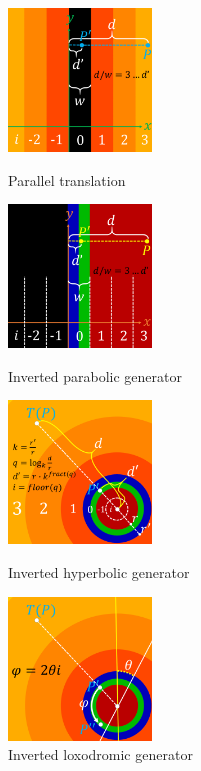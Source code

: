 \begin{figure}[h!tbp]
 \begin{minipage}[t]{0.24\hsize}
  \center
  \includegraphics[width=1.5in, height=1.5in, keepaspectratio]{../img/klein/2diis/translationMod.pdf}
  \caption{Parallel translation}
  \label{fig:translationMod}
 \end{minipage}
 \hspace*{\fill}
 \begin{minipage}[t]{0.24\hsize}
  \center
  \includegraphics[width=1.5in, height=1.5in, keepaspectratio]{../img/klein/2diis/parabolicMod.pdf}
  \caption{Inverted parabolic generator}
  \label{fig:parabolicMod}
 \end{minipage}
 \hspace*{\fill}
 \begin{minipage}[t]{0.24\hsize}
  \center
  \includegraphics[width=1.5in, height=1.5in, keepaspectratio]{../img/klein/2diis/hyperbolicMod.pdf}
  \caption{Inverted hyperbolic generator}
  \label{fig:hyperbolicMod}
 \end{minipage}
 \hspace*{\fill}
 \begin{minipage}[t]{0.24\hsize}
  \center
  \includegraphics[width=1.5in, height=1.5in, keepaspectratio]{../img/klein/2diis/loxodromicModRotation.pdf}
  \caption{Inverted loxodromic generator}
  \label{fig:loxodromicMod}
  \hspace*{\fill}
 \end{minipage}
\end{figure}

